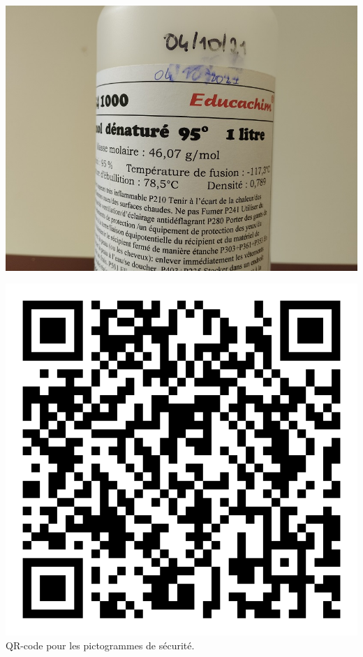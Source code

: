 \begin{minipage}{0.5\textwidth}
\centering
    \includegraphics[scale=0.3]{Images/Bouteille_ethanol.jpg}
\end{minipage}
\begin{minipage}{0.5\textwidth}
\centering
    \includegraphics[scale=0.3]{Images/qrcode_picto.png}
    \\
    QR-code pour les pictogrammes de sécurité.
\end{minipage}

